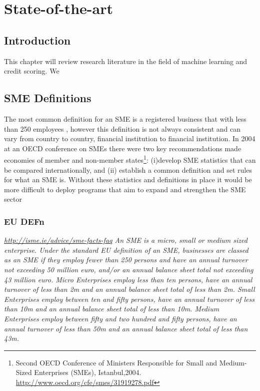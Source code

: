 
\chapter{State-of-the-art} %

\label{Chapter2} %


\section{Introduction}
This chapter will review research literature in the field of machine learning and credit scoring. We 


\section{SME Definitions}
The most common definition for an SME is a registered business that with less than 250 employees \citep{ifc_sme_2009}, however this definition is not always consistent and can vary from country to country, financial institution to financial institution. In 2004 at an OECD conference on SMEs there were two key recommendations made economies of member and non-member states\footnote{Second OECD Conference of Ministers Responsible for Small and Medium-Sized Enterprises (SMEs), Istanbul,2004. \url{http://www.oecd.org/cfe/smes/31919278.pdf}}: (i)develop SME statistics that can be compared internationally, and (ii) establish a common definition and set rules for what an SME is. Without these statistics and definitions in place it would be more difficult to deploy programs that aim to expand and strengthen the SME sector\citep{ardic_small_2011}


\subsection{EU DEFn}
\textit{\url{http://isme.ie/advice/sme-facts-faq}
An SME is a micro, small or medium sized enterprise. Under the standard EU definition of an SME, businesses are classed as an SME if they employ fewer than 250 persons and have an annual turnover not exceeding 50 million euro, and/or an annual balance sheet total not exceeding 43 million euro. Micro Enterprises employ less than ten persons, have an annual turnover of less than 2m and an annual balance sheet total of less than 2m. Small Enterprises employ between ten and fifty persons, have an annual turnover of less than 10m and an annual balance sheet total of less than 10m.  Medium Enterprises employ between fifty and two hundred and fifty persons, have an annual turnover of less than 50m and an annual balance sheet total of less than 43m. 
}

